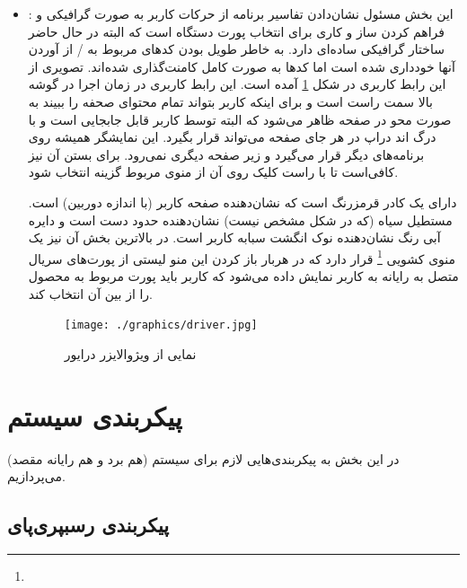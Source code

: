 \documentclass{article}
\begin{document}
\begin{itemize}
لیست دستوراتی که درایور از آن پشتیبانی می‌کند نیز به صورت زیر است:
\begin{latin}
\begin{lstlisting}[language=python]
# patterns send from RPi
patterns = [
    "^(b)[*]([-]?\d+)[*]([-]?\d+)[*]([-]?\d+)[*]([-]?\d+)$",
    "^(v)[*]([-]?\d+)[*]([-]?\d+)$",
    "^(d)$",
    "^(md)$",
    "^(mu)$",
    "^(c)$",
    "^(r)$",
    "^(s)[*]([-]?\d+)$",
    "^p$"
]
\end{lstlisting}	
\end{latin}
	
	\item {}: این بخش مسئول نشان‌دادن تفاسیر برنامه از حرکات کاربر به صورت گرافیکی و فراهم کردن ساز و کاری برای انتخاب پورت دستگاه است که البته در حال حاضر ساختار گرافیکی ساده‌ای دارد. به خاطر طویل بودن کدهای مربوط به / از آوردن آنها خودداری شده است اما کدها به صورت کامل کامنت‌گذاری شده‌اند. تصویری از این رابط کاربری در شکل \ref{gui}
	آمده است.
	این رابط کاربری در زمان اجرا در گوشه بالا سمت راست است و برای اینکه کاربر بتواند تمام محتوای صحفه را ببیند به صورت محو در صفحه ظاهر می‌شود که البته توسط کاربر قابل جابجایی است و با درگ اند دراپ در هر جای صفحه می‌تواند قرار بگیرد. این نمایشگر همیشه روی برنامه‌های دیگر قرار می‌گیرد و زیر صفحه دیگری نمی‌رود. برای بستن آن نیز کافی‌است تا با راست کلیک روی آن از منوی مربوط گزینه   انتخاب شود.
	
	دارای یک کادر قرمز‌رنگ است که نشان‌دهنده صفحه کاربر (با اندازه دوربین) است. مستطیل سیاه (که در شکل مشخص نیست) نشان‌دهنده حدود دست است و دایره آبی رنگ نشان‌دهنده نوک انگشت سبابه کاربر است. در بالاترین بخش آن نیز یک منوی کشویی \footnote{}
قرار دارد که در هربار باز کردن این منو لیستی از پورت‌های سریال متصل به رایانه به کاربر
نمایش داده می‌شود که کاربر باید پورت مربوط به محصول را از بین آن انتخاب کند.

	\begin{figure}
		\centering
		\texttt{[image: ./graphics/driver.jpg]}
		\caption{نمایی از ویژوالایزر درایور}
		\label{gui}
	\end{figure}
	
\end{itemize}

\section{پیکربندی سیستم}
در این بخش به پیکر‌بندی‌هایی لازم برای سیستم (هم برد و هم رایانه مقصد)‌ می‌پردازیم.

\subsection{پیکربندی رسبپری‌پای}
\end{document}
